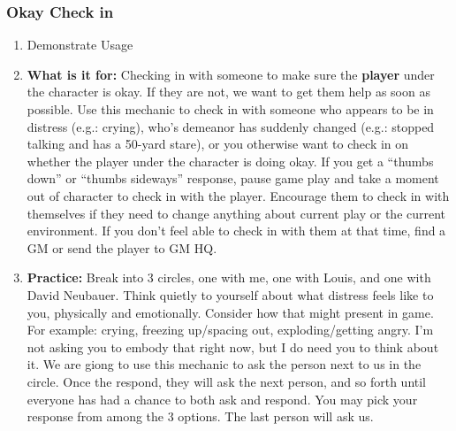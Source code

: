 \documentclass[green]{GL2020}
\begin{document}
\subsubsection*{Okay Check in}
\begin{enumerate}
	\item Demonstrate Usage
	\item \textbf{What is it for:} Checking in with someone to make sure the \textbf{player} under the character is okay. If they are not, we want to get them help as soon as possible. Use this mechanic to check in with someone who appears to be in distress (e.g.: crying), who’s demeanor has suddenly changed (e.g.: stopped talking and has a 50-yard stare), or you otherwise want to check in on whether the player under the character is doing okay. If you get a ``thumbs down'' or ``thumbs sideways'' response, pause game play and take a moment out of character to check in with the player. Encourage them to check in with themselves if they need to change anything about current play or the current environment. If you don’t feel able to check in with them at that time, find a GM or send the player to GM HQ.
	\item \textbf{Practice:} Break into 3 circles, one with me, one with Louis, and one with David Neubauer. Think quietly to yourself about what distress feels like to you, physically and emotionally. Consider how that might present in game. For example: crying, freezing up/spacing out, exploding/getting angry. I’m not asking you to embody that right now, but I do need you to think about it. We are giong to use this mechanic to ask the person next to us in the circle. Once the respond, they will ask the next person, and so forth until everyone has had a chance to both ask and respond. You may pick your response from among the 3 options. The last person will ask us.
\end{enumerate}
\end{document}
